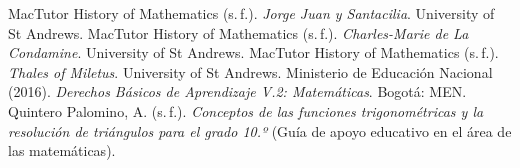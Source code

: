 \documentclass[11pt]{article}
\begin{document}
\begin{referencias}
 MacTutor History of Mathematics (s.\,f.).
  \emph{Jorge Juan y Santacilia}. University of St Andrews.
 MacTutor History of Mathematics (s.\,f.).
  \emph{Charles-Marie de La Condamine}. University of St Andrews.
 MacTutor History of Mathematics (s.\,f.).
  \emph{Thales of Miletus}. University of St Andrews.
 Ministerio de Educación Nacional (2016). \emph{Derechos Básicos de
  Aprendizaje V.2: Matemáticas}. Bogotá: MEN.
 Quintero Palomino, A. (s.\,f.). \emph{Conceptos de las funciones
  trigonométricas y la resolución de triángulos para el grado 10.º} (Guía de apoyo
  educativo en el área de las matemáticas).
\end{referencias}
\end{document}
